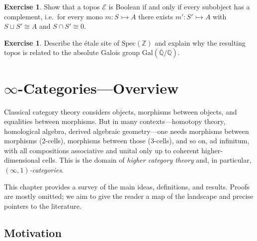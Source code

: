 \documentclass[a4paper,12pt]{book}
\newcommand{\Z}{\mathbb{Z}}
\newcommand{\Q}{\mathbb{Q}}
\theoremstyle{definition}
\newtheorem{exercise}[definition]{Exercise}
\theoremstyle{plain}
\theoremstyle{remark}
\begin{document}
\begin{exercise}\label{ex:boolean-topos}
Show that a topos $\mathcal{E}$ is Boolean if and only if every subobject
has a complement, i.e.\ for every mono $m\colon S\rightarrowtail A$
there exists $m'\colon S'\rightarrowtail A$ with $S\sqcup S'\cong A$
and $S\cap S'\cong 0$.
\end{exercise}

\begin{exercise}\label{ex:etale-site}
Describe the \'etale site of $\mathrm{Spec}(\Z)$ and explain why
the resulting topos is related to the absolute Galois group
$\mathrm{Gal}(\overline{\Q}/\Q)$.
\end{exercise}




\chapter{$\infty$-Categories---Overview}\label{ch:infinity-cats}
\minitoc

\vspace{1em}

Classical category theory considers objects, morphisms between objects,
and equalities between morphisms.  But in many contexts---homotopy theory,
homological algebra, derived algebraic geometry---one needs morphisms
between morphisms (2-cells), morphisms between those (3-cells), and so on,
ad infinitum, with all compositions associative and unital only up to
coherent higher-dimensional cells.  This is the domain of
\emph{higher category theory} and, in particular,
\emph{$(\infty,1)$-categories}.

This chapter provides a survey of the main ideas, definitions, and
results.  Proofs are mostly omitted; we aim to give the reader a map
of the landscape and precise pointers to the literature.


\section{Motivation}\label{sec:infty-motivation}
\end{document}
